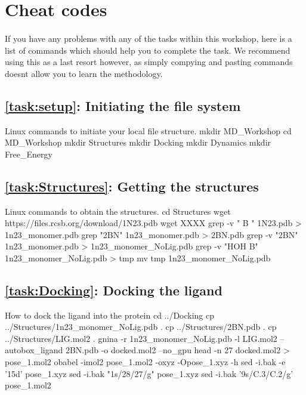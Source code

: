 \newpage
\section{Cheat codes}
    \paragraph{}
    If you have any problems with any of the tasks within this workshop, here is a list of commands which should help you to complete the task. We recommend using this as a last resort however,
    as simply compying and pasting commands doesnt allow you to learn the methodology. 

    \subsection{\cref{task:setup}: Initiating the file system}
    \begin{bashcmd}[label=cmd:task1]{Linux commands to initiate your local file structure.}
    mkdir MD_Workshop
    cd MD_Workshop
    mkdir Structures
    mkdir Docking
    mkdir Dynamics
    mkdir Free_Energy
    \end{bashcmd}
    
    \subsection{\cref{task:Structures}: Getting the structures}
    \begin{bashcmd}[label=cmd:task2]{Linux commands to obtain the structures.}
    cd Structures
    wget https://files.rcsb.org/download/1N23.pdb
    wget XXXX
    grep -v " B " 1N23.pdb > 1n23_monomer.pdb
    grep "2BN" 1n23_monomer.pdb > 2BN.pdb
    grep -v "2BN" 1n23_monomer.pdb > 1n23_monomer_NoLig.pdb  
    grep -v "HOH B" 1n23_monomer_NoLig.pdb > tmp
    mv tmp 1n23_monomer_NoLig.pdb
    \end{bashcmd}

    \subsection{\cref{task:Docking}: Docking the ligand}
    \begin{bashcmd}[label=cmd:task3]{How to dock the ligand into the protein}
    cd ../Docking
    cp ../Structures/1n23_monomer_NoLig.pdb .
    cp ../Structures/2BN.pdb .
    cp ../Structures/LIG.mol2 .
    gnina -r 1n23_monomer_NoLig.pdb -l LIG.mol2 --autobox_ligand 2BN.pdb -o docked.mol2 --no_gpu
    head -n 27 docked.mol2 > pose_1.mol2
    obabel -imol2 pose_1.mol2 -oxyz -Opose_1.xyz -h
    sed -i.bak -e '15d' pose_1.xyz 
    sed -i.bak "1s/28/27/g" pose_1.xyz
    sed -i.bak '9s/C.3/C.2/g' pose_1.mol2
    \end{bashcmd}

